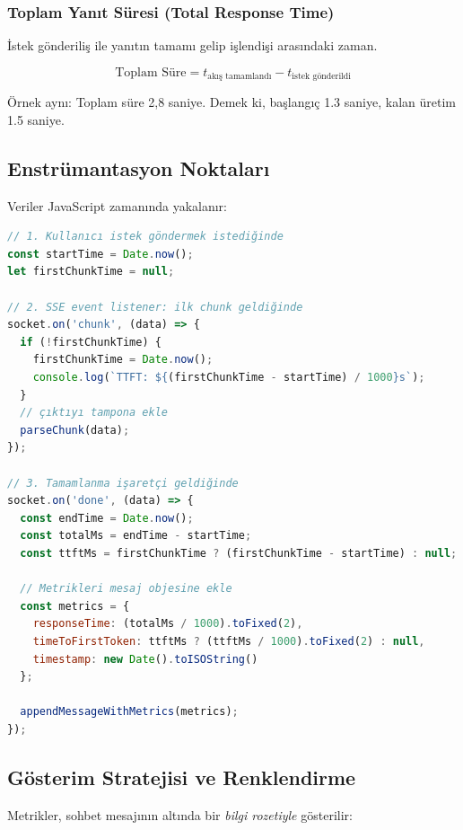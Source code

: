 \documentclass[12pt,a4paper]{article}
\begin{document}
\subsubsection{Toplam Yanıt Süresi (Total Response Time)}
İstek gönderiliş ile yanıtın tamamı gelip işlendişi arasındaki zaman.

$$
\text{Toplam Süre} = t_{\text{akış tamamlandı}} - t_{\text{istek gönderildi}}
$$

Örnek aynı: Toplam süre 2,8 saniye. Demek ki, başlangıç 1.3 saniye, kalan üretim 1.5 saniye.

\subsection{Enstrümantasyon Noktaları}

Veriler JavaScript zamanında yakalanır:

\begin{lstlisting}[language=JavaScript, caption=Events ve Zamanlamanın Yakalanması]
// 1. Kullanıcı istek göndermek istediğinde
const startTime = Date.now();
let firstChunkTime = null;

// 2. SSE event listener: ilk chunk geldiğinde
socket.on('chunk', (data) => {
  if (!firstChunkTime) {
    firstChunkTime = Date.now();
    console.log(`TTFT: ${(firstChunkTime - startTime) / 1000}s`);
  }
  // çıktıyı tampona ekle
  parseChunk(data);
});

// 3. Tamamlanma işaretçi geldiğinde
socket.on('done', (data) => {
  const endTime = Date.now();
  const totalMs = endTime - startTime;
  const ttftMs = firstChunkTime ? (firstChunkTime - startTime) : null;
  
  // Metrikleri mesaj objesine ekle
  const metrics = {
    responseTime: (totalMs / 1000).toFixed(2),
    timeToFirstToken: ttftMs ? (ttftMs / 1000).toFixed(2) : null,
    timestamp: new Date().toISOString()
  };
  
  appendMessageWithMetrics(metrics);
});
\end{lstlisting}

\subsection{Gösterim Stratejisi ve Renklendirme}

Metrikler, sohbet mesajının altında bir \textit{bilgi rozetiyle} gösterilir:
\end{document}
